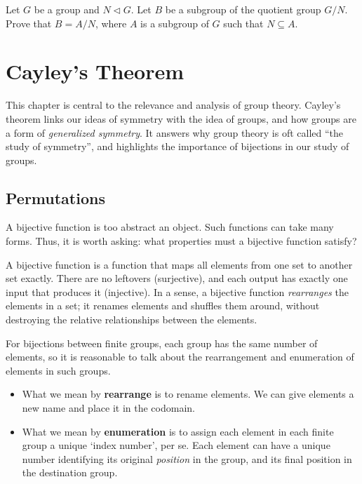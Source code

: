 \begin{problem}\label{problem-subgroup-of-quotient-group-is-quotient-group}
    Let $G$ be a group and $N \lhd G$. Let $B$ be a subgroup of the quotient group $G/N$. Prove that $B = A/N$, where $A$ is a subgroup of $G$ such that $N \subseteq A$.
\end{problem}

\chapter{Cayley's Theorem}
This chapter is central to the relevance and analysis of group theory. Cayley's theorem links our ideas of symmetry with the idea of groups, and how groups are a form of \textit{generalized symmetry}. It answers why group theory is oft called ``the study of symmetry'', and highlights the importance of bijections in our study of groups.

\section{Permutations}
A bijective function is too abstract an object. Such functions can take many forms. Thus, it is worth asking: what properties must a bijective function satisfy?

A bijective function is a function that maps all elements from one set to another set exactly. There are no leftovers (surjective), and each output has exactly one input that produces it (injective). In a sense, a bijective function \textit{rearranges} the elements in a set; it renames elements and shuffles them around, without destroying the relative relationships between the elements.

For bijections between finite groups, each group has the same number of elements, so it is reasonable to talk about the rearrangement and enumeration of elements in such groups.
\begin{itemize}
    \item What we mean by \textbf{rearrange} is to rename elements. We can give elements a new name and place it in the codomain.
    \item What we mean by \textbf{enumeration} is to assign each element in each finite group a unique `index number', per se. Each element can have a unique number identifying its original \textit{position} in the group, and its final position in the destination group.
\end{itemize}

